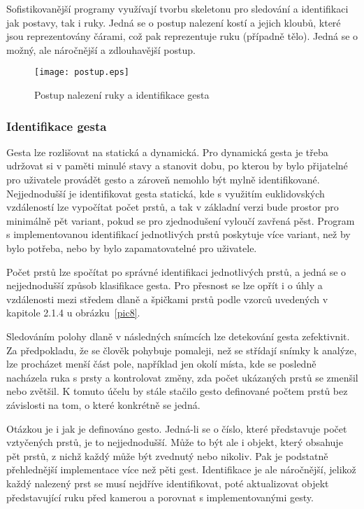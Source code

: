 Sofistikovanější programy využívají tvorbu skeletonu pro sledování a identifikaci jak postavy, tak i ruky. Jedná se o postup nalezení kostí a jejich kloubů, které jsou reprezentovány čárami, což pak reprezentuje ruku (případně tělo). Jedná se o možný, ale náročnější a zdlouhavější postup.

\begin{figure}[htp]
\centering
\texttt{[image: postup.eps]}
\caption{Postup nalezení ruky a identifikace gesta }
\label{picPostup}
\end{figure}

\subsubsection{Identifikace gesta}
Gesta lze rozlišovat na statická a dynamická. Pro dynamická gesta je třeba udržovat si v paměti minulé stavy a stanovit dobu, po kterou by bylo přijatelné pro uživatele provádět gesto a zároveň  nemohlo být mylně identifikované. Nejjednodušší je identifikovat gesta statická, kde s využitím euklidovských vzdáleností lze vypočítat počet prstů, a tak v základní verzi bude prostor pro minimálně pět variant, pokud se pro zjednodušení vyloučí zavřená pěst. Program s implementovanou identifikací jednotlivých prstů poskytuje více variant, než by bylo potřeba, nebo by bylo zapamatovatelné pro uživatele.

Počet prstů lze spočítat po správné identifikaci jednotlivých prstů, a jedná se o nejjednodušší způsob klasifikace gesta. Pro přesnost se lze opřít i o úhly a vzdálenosti mezi středem dlaně a špičkami prstů podle vzorců uvedených v kapitole 2.1.4 u obrázku~\ref{pic8}.

Sledováním polohy dlaně v následných snímcích lze detekování gesta zefektivnit. Za předpokladu, že se člověk pohybuje pomaleji, než se střídají snímky k analýze, lze procházet menší část pole, například jen okolí místa, kde se posledně nacházela ruka s prsty a kontrolovat změny, zda počet ukázaných prstů se zmenšil nebo zvětšil. K tomuto účelu by stále stačilo gesto definované počtem prstů bez závislosti na tom, o které konkrétně se jedná.

Otázkou je i jak je definováno gesto. Jedná-li se o číslo, které představuje počet vztyčených prstů, je to nejjednodušší. Může to být ale i objekt, který obsahuje pět prstů, z nichž každý může být zvednutý nebo nikoliv. Pak je podstatně přehlednější implementace více než pěti gest. Identifikace je ale náročnější, jelikož každý nalezený prst se musí nejdříve identifikovat, poté aktualizovat objekt představující ruku před kamerou a porovnat s implementovanými gesty. 

